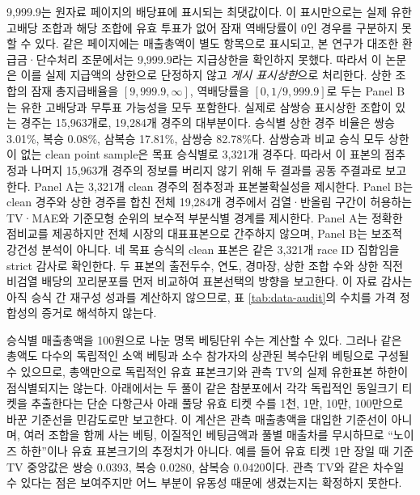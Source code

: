 9,999.9는 원자료 페이지의 배당표에 표시되는 최댓값이다. 이 표시만으로는
실제 유한 고배당 조합과 해당 조합에 유효 투표가 없어 잠재 역배당률이 0인
경우를 구분하지 못할 수 있다. 같은 페이지에는
매출총액이 별도 항목으로 표시되고, 본 연구가 대조한 환급금·단수처리 조문에서는
9,999.9라는 지급상한을 확인하지 못했다. 따라서 이 논문은 이를 실제 지급액의
상한으로 단정하지 않고 \emph{게시 표시상한}으로 처리한다. 상한 조합의
잠재 총지급배율을 $[9{,}999.9,\infty]$, 역배당률을
$[0,1/9{,}999.9]$로 두는 Panel B는 유한 고배당과 무투표 가능성을 모두
포함한다. 실제로 삼쌍승
표시상한 조합이 있는 경주는 15,963개로,
19,284개 경주의 대부분이다. 승식별 상한 경주 비율은 쌍승 3.01\%, 복승
0.08\%, 삼복승 17.81\%, 삼쌍승 82.78\%다.
삼쌍승과 비교 승식 모두 상한이 없는 clean point sample은 목표 승식별로 3,321개
경주다. 따라서 이 표본의 점추정과 나머지 15,963개 경주의 정보를 버리지 않기
위해 두 결과를 공동 주결과로 보고한다. Panel A는 3,321개 clean 경주의 점추정과
표본불확실성을 제시한다. Panel B는 clean 경주와 상한 경주를 합친 전체 19,284개
경주에서 검열·반올림 구간이 허용하는 TV·MAE와 기준모형 순위의 보수적
부분식별 경계를 제시한다. Panel A는 정확한 점비교를 제공하지만 전체 시장의
대표표본으로 간주하지 않으며, Panel B는 보조적 강건성 분석이 아니다. 네 목표
승식의 clean 표본은 같은 3,321개 race ID 집합임을 strict 감사로 확인한다. 두
표본의 출전두수, 연도, 경마장, 상한 조합 수와 상한 직전 비검열 배당의
꼬리분포를 먼저 비교하여 표본선택의 방향을 보고한다. 이 자료 감사는 아직 승식
간 재구성 성과를 계산하지 않으므로, 표 \ref{tab:data-audit}의 수치를 가격
정합성의 증거로 해석하지 않는다.

승식별 매출총액을 100원으로 나눈 명목 베팅단위 수는 계산할 수 있다. 그러나
같은 총액도 다수의 독립적인 소액 베팅과 소수 참가자의 상관된 복수단위 베팅으로
구성될 수 있으므로, 총액만으로 독립적인 유효 표본크기와 관측 TV의 실제
유한표본 하한이 점식별되지는 않는다. 아래에서는 두 풀이 같은 참분포에서 각각
독립적인 동일크기 티켓을 추출한다는 단순
다항근사 아래 풀당 유효 티켓 수를 1천, 1만, 10만, 100만으로 바꾼 기준선을
민감도로만 보고한다. 이 계산은 관측 매출총액을 대입한 기준선이 아니며, 여러
조합을 함께 사는 베팅, 이질적인 베팅금액과 풀별 매출차를 무시하므로
``노이즈 하한''이나 유효 표본크기의 추정치가 아니다.
예를 들어 유효 티켓 1만 장일 때 기준 TV 중앙값은 쌍승 0.0393, 복승 0.0280,
삼복승 0.0420이다. 관측 TV와 같은 차수일 수 있다는 점은 보여주지만 어느
부분이 유동성 때문에 생겼는지는 확정하지 못한다.

\begin{table}[htbp]
\centering
\caption{유한 풀·이산 베팅 민감도 기준선. 두 독립 풀의 유효 티켓 수가 같다는
다항근사이며 관측 매출총액을 대입한 계산이나 유효 표본크기의 추정이 아니다. 관측 TV는 clean
Panel A의 삼쌍승 주변화 모형 중앙값이다.}
\label{tab:finite-pool-reference}
\resizebox{0.88\textwidth}{!}{}
\end{table}
